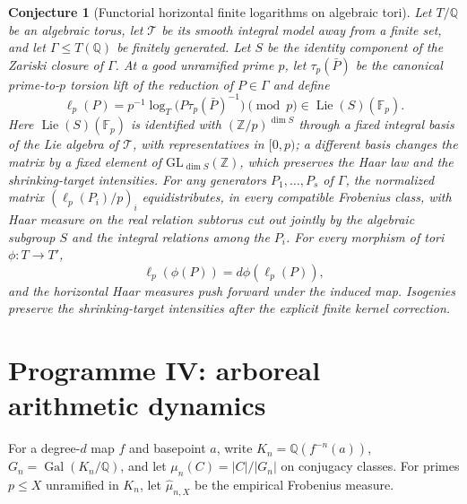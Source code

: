 \documentclass[11pt]{article}
\newtheorem{conjecture}{Conjecture}
\theoremstyle{definition}
\newcommand{\Gal}{\operatorname{Gal}}
\newcommand{\Fq}{\mathbb F}
\newcommand{\Z}{\mathbb Z}
\newcommand{\Q}{\mathbb Q}
\providecommand{\Z}{\mathbb Z}
\providecommand{\Q}{\mathbb Q}
\begin{document}
\begin{conjecture}[Functorial horizontal finite logarithms on algebraic tori]\label{s15}
Let $T/\Q$ be an algebraic torus, let $\mathcal T$ be its smooth integral model away from
a finite set, and let $\Gamma\le T(\Q)$ be finitely generated.  Let $S$ be the identity
component of the Zariski closure of $\Gamma$.  At a good unramified prime $p$, let
$\tau_p(\bar P)$ be the canonical prime-to-$p$ torsion lift of the reduction of
$P\in\Gamma$ and define
\[
 \ell_p(P)=p^{-1}\log_T\bigl(P\tau_p(\bar P)^{-1}\bigr)\pmod p
 \in\operatorname{Lie}(S)(\Fq_p).
\]
Here $\operatorname{Lie}(S)(\Fq_p)$ is identified with $(\Z/p)^{\dim S}$ through a fixed integral basis of the Lie algebra of $\mathcal T$, with representatives in $[0,p)$; a different basis changes the matrix by a fixed element of $\mathrm{GL}_{\dim S}(\Z)$, which preserves the Haar law and the shrinking-target intensities.  For any generators $P_1,\ldots,P_s$ of $\Gamma$, the normalized matrix
$(\ell_p(P_i)/p)_i$ equidistributes, in every compatible Frobenius class, with Haar
measure on the real relation subtorus cut out jointly by the algebraic subgroup $S$ and
the integral relations among the $P_i$.  For every morphism of tori $\phi:T\to T'$,
\[
 \ell_p(\phi(P))=d\phi(\ell_p(P)),
\]
and the horizontal Haar measures push forward under the induced map.  Isogenies preserve
the shrinking-target intensities after the explicit finite kernel correction.
\end{conjecture}

\section{Programme IV: arboreal arithmetic dynamics}

For a degree-$d$ map $f$ and basepoint $a$, write
$K_n=\Q(f^{-n}(a))$, $G_n=\Gal(K_n/\Q)$, and let
$\mu_n(C)=|C|/|G_n|$ on conjugacy classes.  For primes $p\le X$ unramified in $K_n$,
let $\widehat\mu_{n,X}$ be the empirical Frobenius measure.
\end{document}
